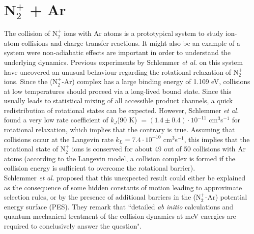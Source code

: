 \documentclass[journal=jacsat,manuscript=article]{achemso}
\begin{document}
\section{N$_2^+$ + Ar}
\label{sec:n2plusar}
The collision of N$_2^+$ ions with Ar atoms is a prototypical system to study ion-atom collisions and charge transfer reactions. It might also be an example of a system were non-adiabatic effects are important in order to understand the underlying dynamics. Previous experiments by Schlemmer \textit{et al.}\cite{schlemmer.ijms.1999.n2plusargon} on this system have uncovered an unusual behaviour regarding the rotational relaxation of N$_2^+$ ions.
Since the (N$_2^+$-Ar) complex has a large binding energy of 1.109 eV\cite{mahnert.jcp.1995.n2plusargon}, collisions at low temperatures should proceed via a long-lived bound state. Since this usually leads to statistical mixing of all accessible product channels, a quick redistribution of rotational states can be expected. However, Schlemmer \textit{et al.} found a very low rate coefficient of $k_J$(90 K) $= (1.4\pm 0.4) \cdot 10^{-11}$ cm$^3$s$^{-1}$ for rotational relaxation, which implies that the contrary is true. Assuming that collisions occur at the Langevin rate $k_L = 7.4\cdot10^{-10}$ cm$^3$s$^{-1}$, this implies that the rotational state of N$_2^+$ ions is conserved for about 49 out of 50 collisions with Ar atoms (according to the Langevin model, a collision complex is formed if the collision energy is sufficient to overcome the rotational barrier).\cite{schlemmer.ijms.1999.n2plusargon}\\
\noindent Schlemmer \textit{et al.} proposed that this unexpected result could either be explained as the consequence of some hidden constants of motion leading to approximate selection rules, or by the presence of additional barriers in the (N$_2^+$-Ar) potential energy surface (PES). They remark that ``detailed \textit{ab initio} calculations and quantum mechanical treatment of the collision dynamics at meV energies are required to conclusively answer the question".\cite{schlemmer.ijms.1999.n2plusargon}\\
\end{document}
